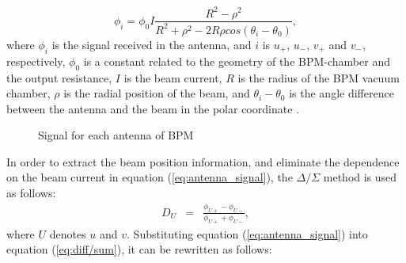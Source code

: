 \documentclass[english,review,number,sort&compress]{elsarticle}
\begin{document}
\begin{equation}
\phi_{i}=\phi_{0}I\frac{R^{2}-\rho^{2}}{R^{2}+\rho^{2}-2R\rho cos(\theta_{i}-\theta_{0})},\label{eq:antenna_signal}
\end{equation}
where $\phi_{i}$ is the signal received in the antenna, and $i$ is $u_{+}$, $u_{-}$, $v_{+}$ and $v_{-}$, respectively, $\phi_{0}$ is a constant related to the geometry of the BPM-chamber and the output resistance, $I$ is the beam current, $R$ is the radius of the BPM vacuum chamber, $\rho$ is the radial position of the beam, and $\theta_{i}-\theta_{0}$ is the angle difference between the antenna and the beam in the polar coordinate . 
\begin{figure}[tbph]
\begin{centering}
\par\end{centering}

\protect\caption{\label{fig:mirror_method}Signal for each antenna of BPM}
\end{figure}


In order to extract the beam position information, and eliminate the dependence on the beam current in equation (\ref{eq:antenna_signal}), the $\Delta/\Sigma$ method is used as follows:
\begin{eqnarray}
D_{U} & = & \frac{\phi_{U+}-\phi_{U-}}{\phi_{U+}+\phi_{U-}},\label{eq:diff/sum}
\end{eqnarray}
where $U$ denotes $u$ and $v$. Substituting equation (\ref{eq:antenna_signal}) into equation (\ref{eq:diff/sum}), it can be rewritten as follows:
\end{document}
